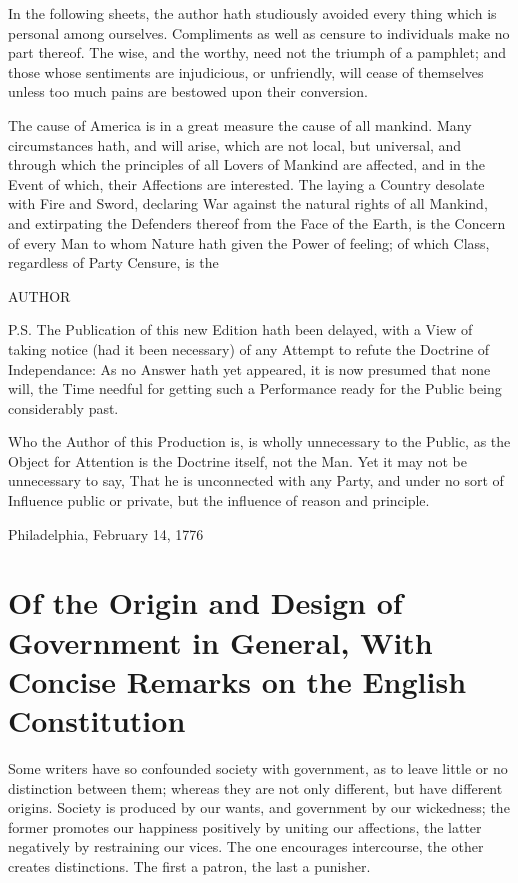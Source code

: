 \documentclass[12pt,oneside]{memoir}
\begin{document}
In the following sheets, the author hath studiously avoided every thing which is personal among ourselves. Compliments as well as censure to individuals make no part thereof. The wise, and the worthy, need not the triumph of a pamphlet; and those whose sentiments are injudicious, or unfriendly, will cease of themselves unless too much pains are bestowed upon their conversion.

The cause of America is in a great measure the cause of all mankind. Many circumstances hath, and will arise, which are not local, but universal, and through which the principles of all Lovers of Mankind are affected, and in the Event of which, their Affections are interested. The laying a Country desolate with Fire and Sword, declaring War against the natural rights of all Mankind, and extirpating the Defenders thereof from the Face of the Earth, is the Concern of every Man to whom Nature hath given the Power of feeling; of which Class, regardless of Party Censure, is the

AUTHOR

P.S. The Publication of this new Edition hath been delayed, with a View of taking notice (had it been necessary) of any Attempt to refute the Doctrine of Independance: As no Answer hath yet appeared, it is now presumed that none will, the Time needful for getting such a Performance ready for the Public being considerably past.

Who the Author of this Production is, is wholly unnecessary to the Public, as the Object for Attention is the Doctrine itself, not the Man. Yet it may not be unnecessary to say, That he is unconnected with any Party, and under no sort of Influence public or private, but the influence of reason and principle.

Philadelphia, February 14, 1776
\mainmatter

\section*{Of the Origin and Design of Government in General, With Concise Remarks on the English Constitution}

Some writers have so confounded society with government, as to leave little or no distinction between them; whereas they are not only different, but have different origins. Society is produced by our wants, and government by our wickedness; the former promotes our happiness positively by uniting our affections, the latter negatively by restraining our vices. The one encourages intercourse, the other creates distinctions. The first a patron, the last a punisher.
\end{document}

